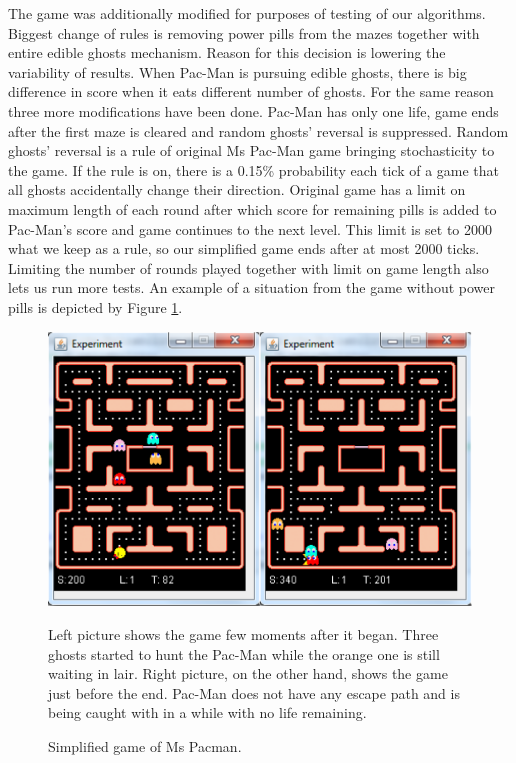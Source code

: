 The game was
additionally modified for purposes of testing of our algorithms. Biggest change of rules is
removing power pills from the mazes together with entire edible ghosts mechanism. Reason for
this decision is lowering the variability of results. When Pac-Man is pursuing edible ghosts,
there is big difference in score when it eats different number of ghosts. For the same reason
three more modifications have been done. Pac-Man has only one life, game ends after the first
maze is cleared and random ghosts' reversal is suppressed. Random ghosts' reversal is a rule of
original Ms Pac-Man game bringing stochasticity to the game. If the rule is on, there is a 0.15\% 
probability each tick of a game that all
ghosts accidentally change their direction. Original game has a limit on maximum length of each
round after which score for remaining pills is added to Pac-Man's score and game continues to
the next level. This limit is set to 2000 what we keep as a rule, so our simplified game ends
after at most 2000 ticks. Limiting the number of rounds played together with limit on game
length also lets us run more tests.
An example of a situation from the game without
power pills is depicted by Figure \ref{fig_pacman_framework}.

\begin{figure}
\begin{center}
\includegraphics[width=14cm]{img/pacman_framework.eps}
\end{center}
\caption{\footnotesize Simplified game of Ms Pacman.}{\footnotesize Left picture shows the game few moments after it began. Three
ghosts started to hunt the Pac-Man while the orange one is still waiting in lair. Right
picture, on the other hand, shows the game just before the end. Pac-Man does not have any
escape path and is being caught with in a while with no life remaining.}
\label{fig_pacman_framework}
\end{figure}

